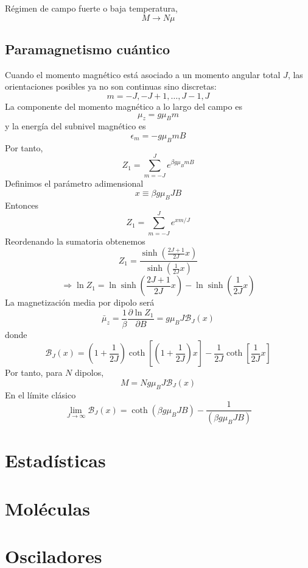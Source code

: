 \documentclass[]{article}
\numberwithin{equation}{section}
\newcommand{\0}{\textcolor{gray}{0}}
\newcommand{\pd}[2]{\dfrac{\partial #1}{\partial #2}}
\begin{document}
Régimen de campo fuerte o baja temperatura,
\begin{equation}
	M \rightarrow N\mu
\end{equation}

\subsection{Paramagnetismo cuántico}
Cuando el momento magnético está asociado a un momento angular total $J$, las orientaciones posibles ya no son continuas sino discretas:
\begin{equation}
	m = -J, -J + 1,\ldots, J - 1, J
\end{equation}
La componente del momento magnético a lo largo del campo es
\begin{equation}
	\mu_z = g \mu_B m
\end{equation}
y la energía del subnivel magnético es
\begin{equation}
	\epsilon_m = -g\mu_B m B
\end{equation}
Por tanto,
\begin{equation*}
	Z_1 = \sum_{m=-J}^{J} e^{\beta g \mu_B m B}
\end{equation*}
Definimos el parámetro adimensional
\begin{equation}
	x \equiv \beta g \mu_B J B
\end{equation}
Entonces
\begin{equation}
	Z_1 = \sum_{m=-J}^{J} e^{x m/J}
\end{equation}
Reordenando la sumatoria obtenemos
\begin{equation}
	Z_1 = \frac{\sinh\left(\frac{2J+1}{2J} x\right)}{\sinh\left(\frac{1}{2J} x\right)}
\end{equation}
\begin{equation}
	\Rightarrow \ln Z_1 = \ln\sinh\left(\frac{2J+1}{2J} x\right) - \ln\sinh\left(\frac{1}{2J} x\right)
\end{equation}
La magnetización media por dipolo será
\begin{equation}
	\bar{\mu}_z = \frac{1}{\beta} \pd{\ln Z_1}{B} = g\mu_B J \mathcal{B}_J(x)
\end{equation}
donde
\begin{equation}
	\mathcal{B}_J(x) = \left(1 + \frac{1}{2J}\right) \coth\left[\left(1 + \frac{1}{2J}\right) x \right] - \frac{1}{2J}\coth\left[\frac{1}{2J} x\right]
\end{equation}
Por tanto, para $N$ dipolos,
\begin{equation}
	M = N g \mu_B J \mathcal{B}_J(x)
\end{equation}
En el límite clásico
\begin{equation}
	\lim_{J\rightarrow\infty} \mathcal{B}_J(x) = \coth \left(\beta g\mu_B J B\right) - \frac{1}{\left(\beta g\mu_B J B\right)}
\end{equation}




\section{Estadísticas}

\section{Moléculas}

\section{Osciladores}
\end{document}
